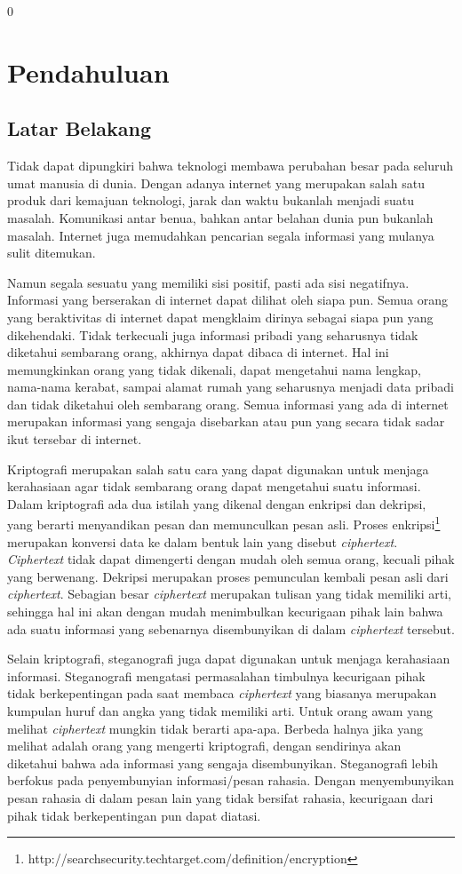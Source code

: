0\chapter{Pendahuluan}
\label{chap:pendahuluan}

\section{Latar Belakang}
\label{sec:latarbelakang}

Tidak dapat dipungkiri bahwa teknologi membawa perubahan besar pada seluruh umat manusia di dunia. Dengan adanya internet yang merupakan salah satu produk dari kemajuan teknologi, jarak dan waktu bukanlah menjadi suatu masalah. Komunikasi antar benua, bahkan antar belahan dunia pun bukanlah masalah. Internet juga memudahkan pencarian segala informasi yang mulanya sulit ditemukan.

Namun segala sesuatu yang memiliki sisi positif, pasti ada sisi negatifnya. Informasi yang berserakan di internet dapat dilihat oleh siapa pun. Semua orang yang beraktivitas di internet dapat mengklaim dirinya sebagai siapa pun yang dikehendaki. Tidak terkecuali juga informasi pribadi yang seharusnya tidak diketahui sembarang orang, akhirnya dapat dibaca di internet. Hal ini memungkinkan orang yang tidak dikenali, dapat mengetahui nama lengkap, nama-nama kerabat, sampai alamat rumah yang seharusnya menjadi data pribadi dan tidak diketahui oleh sembarang orang. Semua informasi yang ada di internet merupakan informasi yang sengaja disebarkan atau pun yang secara tidak sadar ikut tersebar di internet.

Kriptografi merupakan salah satu cara yang dapat digunakan untuk menjaga kerahasiaan agar tidak sembarang orang dapat mengetahui suatu informasi. Dalam kriptografi ada dua istilah yang dikenal dengan enkripsi dan dekripsi, yang berarti menyandikan pesan dan memunculkan pesan asli. Proses enkripsi\footnote{http://searchsecurity.techtarget.com/definition/encryption} merupakan konversi data ke dalam bentuk lain yang disebut \textit{ciphertext}. \textit{Ciphertext} tidak dapat dimengerti dengan mudah oleh semua orang, kecuali pihak yang berwenang. Dekripsi merupakan proses pemunculan kembali pesan asli dari \textit{ciphertext}. Sebagian besar \textit{ciphertext} merupakan tulisan yang tidak memiliki arti, sehingga hal ini akan dengan mudah menimbulkan kecurigaan pihak lain bahwa ada suatu informasi yang sebenarnya disembunyikan di dalam \textit{ciphertext} tersebut.

Selain kriptografi, steganografi juga dapat digunakan untuk menjaga kerahasiaan informasi. Steganografi mengatasi permasalahan timbulnya kecurigaan pihak tidak berkepentingan pada saat membaca \textit{ciphertext} yang biasanya merupakan kumpulan huruf dan angka yang tidak memiliki arti. Untuk orang awam yang melihat \textit{ciphertext} mungkin tidak berarti apa-apa. Berbeda halnya jika yang melihat adalah orang yang mengerti kriptografi, dengan sendirinya akan diketahui bahwa ada informasi yang sengaja disembunyikan. Steganografi lebih berfokus pada penyembunyian informasi/pesan rahasia. Dengan menyembunyikan pesan rahasia di dalam pesan lain yang tidak bersifat rahasia, kecurigaan dari pihak tidak berkepentingan pun dapat diatasi.

